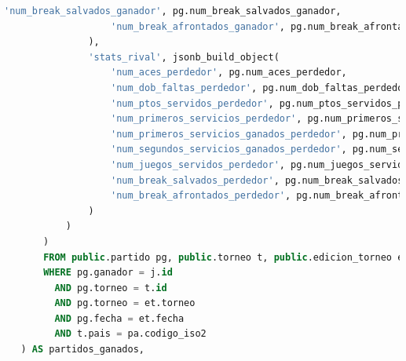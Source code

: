 \documentclass[10pt]{opticajnl}
\begin{document}
\begin{lstlisting}[language=SQL]
                   'num_break_salvados_ganador', pg.num_break_salvados_ganador,
                   'num_break_afrontados_ganador', pg.num_break_afrontados_ganador
               ),
               'stats_rival', jsonb_build_object(
                   'num_aces_perdedor', pg.num_aces_perdedor,
                   'num_dob_faltas_perdedor', pg.num_dob_faltas_perdedor,
                   'num_ptos_servidos_perdedor', pg.num_ptos_servidos_perdedor,
                   'num_primeros_servicios_perdedor', pg.num_primeros_servicios_perdedor,
                   'num_primeros_servicios_ganados_perdedor', pg.num_primeros_servicios_ganados_perdedor,
                   'num_segundos_servicios_ganados_perdedor', pg.num_segundos_servicios_ganados_perdedor,
                   'num_juegos_servidos_perdedor', pg.num_juegos_servidos_perdedor,
                   'num_break_salvados_perdedor', pg.num_break_salvados_perdedor,
                   'num_break_afrontados_perdedor', pg.num_break_afrontados_perdedor
               )
           )
       )
       FROM public.partido pg, public.torneo t, public.edicion_torneo et, public.pais pa
       WHERE pg.ganador = j.id
         AND pg.torneo = t.id
         AND pg.torneo = et.torneo
         AND pg.fecha = et.fecha
         AND t.pais = pa.codigo_iso2
   ) AS partidos_ganados,


\end{lstlisting}
\end{document}
